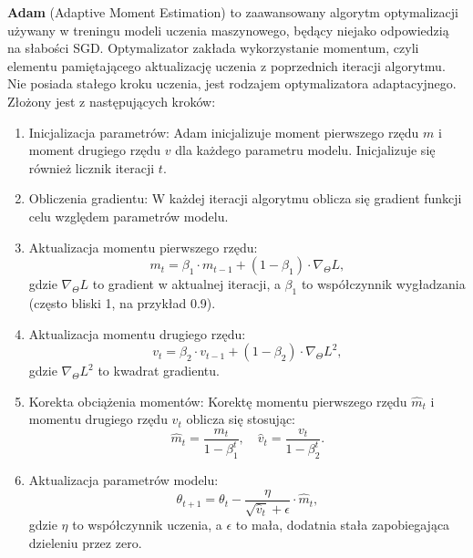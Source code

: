 \textbf{Adam} (Adaptive Moment Estimation) to zaawansowany algorytm optymalizacji używany w treningu modeli uczenia maszynowego, będący niejako odpowiedzią na słabości SGD\cite{kingma2014adam}. Optymalizator zakłada wykorzystanie momentum\cite{rumelhart1986learning}, czyli elementu pamiętającego aktualizację uczenia z poprzednich iteracji algorytmu. Nie posiada stałego kroku uczenia, jest rodzajem optymalizatora adaptacyjnego. Złożony jest z następujących kroków:


\begin{enumerate}
    \item Inicjalizacja parametrów: Adam inicjalizuje moment pierwszego rzędu \(m\) i moment drugiego rzędu \(v\) dla każdego parametru modelu. Inicjalizuje się również licznik iteracji \(t\).
    
    \item Obliczenia gradientu: W każdej iteracji algorytmu oblicza się gradient funkcji celu względem parametrów modelu.
    
    \item Aktualizacja momentu pierwszego rzędu:
    \begin{equation*}
        m_t = \beta_1 \cdot m_{t-1} + (1 - \beta_1) \cdot \nabla_{\Theta}L,
    \end{equation*}
    gdzie \(\nabla_{\Theta}L\) to gradient w aktualnej iteracji, a \(\beta_1\) to współczynnik wygładzania (często bliski 1, na przykład 0.9).
    
    \item Aktualizacja momentu drugiego rzędu:
    \begin{equation*}
        v_t = \beta_2 \cdot v_{t-1} + (1 - \beta_2) \cdot \nabla_{\Theta}L^2,
    \end{equation*}
    gdzie \(\nabla_{\Theta}L^2\) to kwadrat gradientu.
    
    \item Korekta obciążenia momentów: Korektę momentu pierwszego rzędu \(\hat{m}_t\) i momentu drugiego rzędu \(\hat{v}_t\) oblicza się stosując:
    \begin{equation*}
        \hat{m}_t = \frac{m_t}{1 - \beta_1^t}, \quad \hat{v}_t = \frac{v_t}{1 - \beta_2^t}.
    \end{equation*}
    
    \item Aktualizacja parametrów modelu:
    \begin{equation*}
        \theta_{t+1} = \theta_t - \frac{\eta}{\sqrt{\hat{v}_t} + \epsilon} \cdot \hat{m}_t,
    \end{equation*}
    gdzie \(\eta\) to współczynnik uczenia, a \(\epsilon\) to mała, dodatnia stała zapobiegająca dzieleniu przez zero.
\end{enumerate}
\par 


